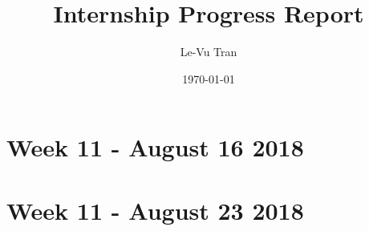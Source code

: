 \documentclass[a4paper]{report}
\title{Internship Progress Report}
\author{Le-Vu Tran}
\date{\today}
\begin{document}
\maketitle

\tableofcontents

\iffalse
\chapter{Week 1 - June 7, 2018}


\chapter{Week 2 - June 12, 2018}


\chapter{Week 3 - June 19, 2018}


\chapter{Week 4 - June 26, 2018}


\chapter{Week 5 - July 5 2018}


\chapter{Week 6 - July 12 2018}


\chapter{Week 7 - July 19 2018}


\chapter{Week 8 - July 26 2018}


\chapter{Week 9 - August 2 2018}


\chapter{Week 10 - August 9 2018}

\fi
\chapter{Week 11 - August 16 2018}


\chapter{Week 11 - August 23 2018}



\end{document}
